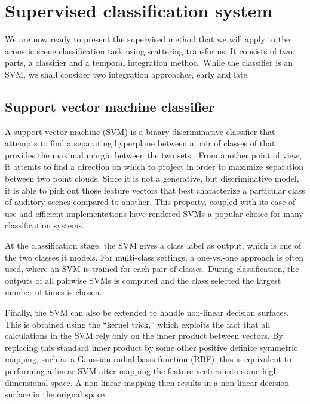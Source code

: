 \documentclass[journal]{IEEEtran}
\makeatletter
\newcommand*{\vs}{vs.\@\xspace}
\makeatother
\begin{document}
\section{Supervised classification system}
\label{sec:supervised}

We are now ready to present the supervised method that we will apply to the acoustic scene classification task using scattering transforms. It consists of two parts, a classifier and a temporal integration method. While the classifier is an SVM, we shall consider two integration approaches, early and late.

\subsection{Support vector machine classifier}
\label{sec:svm}

A support vector machine (SVM) is a binary discriminative classifier that attempts to find a separating hyperplane between a pair of classes of that provides the maximal margin between the two sets \cite{cortes-vapnik}. From another point of view, it attemts to find a direction on which to project in order to maximize separation between two point clouds. Since it is not a generative, but discriminative model, it is able to pick out those feature vectors that best characterize a particular class of auditory scenes compared to another. This property, coupled with its ease of use and efficient implementations \cite{libsvm} have rendered SVMs a popular choice for many classification systems.

At the classification stage, the SVM gives a class label as output, which is one of the two classes it models. For multi-class settings, a one-\vs-one approach is often used, where an SVM is trained for each pair of classes. During classification, the outputs of all pairwise SVMs is computed and the class selected the largest number of times is chosen.

Finally, the SVM can also be extended to handle non-linear decision surfaces. This is obtained using the ``kernel trick,'' which exploits the fact that all calculations in the SVM rely only on the inner product between vectors. By replacing this standard inner product by some other positive definite symmetric mapping, such as a Gaussian radial basis function (RBF), this is equivalent to performing a linear SVM after mapping the feature vectors into some high-dimensional space. A non-linear mapping then results in a non-linear decision surface in the orignal space.
\end{document}
